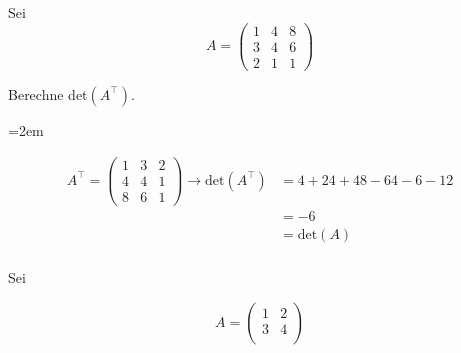 \subsubsection{} %

Sei
\begin{equation*}
    A = \begin{pmatrix}
    1 & 4 & 8 \\
    3 & 4 & 6 \\
    2 & 1 & 1
    \end{pmatrix}
\end{equation*}

Berechne det\((A^\top)\). 

\vspace{1\baselineskip}

\begin{solution}    

    \vspace{1\baselineskip}

    \leftskip=2em

    \begin{equation*}
        \begin{aligned}    
            A^\top = \begin{pmatrix}
            1 & 3 & 2 \\
            4 & 4 & 1 \\
            8 & 6 & 1 
            \end{pmatrix} \rightarrow \text{det}(A^\top) &= 4 + 24 + 48 - 64 - 6 - 12 \\
            &= -6 \\
            &= \text{det}(A) 
        \end{aligned}
    \end{equation*}

\end{solution}

\vspace{3cm}

\subsubsection{}

Sei 

\begin{equation*}
    A = \begin{pmatrix}
    1 & 2 \\
    3 & 4 \\
    \end{pmatrix}
\end{equation*}

